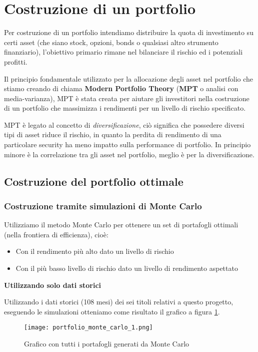 \section{Costruzione di un portfolio}

Per costruzione di un portfolio intendiamo distribuire la quota di investimento su certi asset (che siano stock, opzioni, bonds o qualsiasi altro strumento finanziario), l'obiettivo primario rimane nel bilanciare il rischio ed i potenziali profitti.

Il principio fondamentale utilizzato per la allocazione degli asset nel portfolio che stiamo creando di chiama \textbf{Modern Portfolio Theory} (\textbf{MPT} o analisi con media-varianza), MPT è stata creata
per aiutare gli investitori nella costruzione di un portfolio che massimizza i rendimenti per un livello di rischio specificato.

MPT è legato al concetto di \emph{diversificazione}, ciò significa che possedere diversi tipi di asset riduce il rischio, in quanto la perdita di rendimento di una particolare security ha meno impatto
sulla performance di portfolio. In principio minore è la correlazione tra gli asset nel portfolio, meglio è per la diversificazione.

\subsection{Costruzione del portfolio ottimale}

\subsubsection{Costruzione tramite simulazioni di Monte Carlo}

Utilizziamo il metodo Monte Carlo per ottenere un set di portafogli ottimali (nella frontiera di efficienza), cioè:
\begin{itemize}
    \item Con il rendimento più alto dato un livello di rischio
    \item Con il più basso livello di rischio dato un livello di rendimento aspettato
\end{itemize}

\textbf{Utilizzando solo dati storici}

Utilizzando i dati storici (108 mesi) dei sei titoli relativi a questo progetto, eseguendo le simulazioni otteniamo come risultato il grafico a figura \ref{fig:pf_monte_carlo_1}.

\begin{figure}[ht]
    \centering
    \texttt{[image: portfolio\_monte\_carlo\_1.png]}
    \caption{Grafico con tutti i portafogli generati da Monte Carlo}
    \label{fig:pf_monte_carlo_1}
\end{figure}

